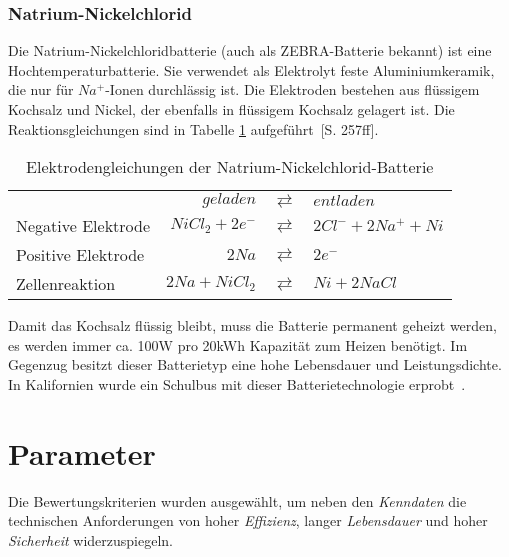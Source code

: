 \subsubsection{Natrium-Nickelchlorid}
Die Natrium-Nickelchloridbatterie (auch als ZEBRA-Batterie bekannt) ist eine Hochtemperaturbatterie. Sie verwendet als Elektrolyt feste Aluminiumkeramik, die nur für $Na^+$-Ionen durchlässig ist. Die Elektroden bestehen aus flüssigem Kochsalz und Nickel, der ebenfalls in flüssigem Kochsalz gelagert ist. Die Reaktionsgleichungen sind in Tabelle \ref{ZEBRA} aufgeführt~\cite{KiehneBattery}[S. 257ff].

\begin{table}\centering %
	\begin{tabularx}{\linewidth}{XrcX}
		\toprule
		&       $geladen$ & $\rightleftarrows$ & $entladen$           \\
		Negative Elektrode & $NiCl_2 + 2e^-$ & $\rightleftarrows$ & $2Cl^- + 2Na^+ + Ni$ \\
		Positive Elektrode &           $2Na$ & $\rightleftarrows$ & $2e^-$               \\ \midrule
		Zellenreaktion     &  $2Na + NiCl_2$ & $\rightleftarrows$ & $Ni + 2NaCl$ \\ \bottomrule
	\end{tabularx}
	\caption{Elektrodengleichungen der Natrium-Nickelchlorid-Batterie}
	\label{ZEBRA}
\end{table}

Damit das Kochsalz flüssig bleibt, muss die Batterie permanent geheizt werden, es werden immer ca. 100W pro 20kWh Kapazität zum Heizen benötigt. Im Gegenzug besitzt dieser Batterietyp eine hohe Lebensdauer und Leistungsdichte. In Kalifornien wurde ein Schulbus mit dieser Batterietechnologie erprobt~\cite{Electric-Transportation-Department:2004}.

\section{Parameter}
Die Bewertungskriterien wurden ausgewählt, um neben den \emph{Kenndaten} die technischen Anforderungen von hoher \emph{Effizienz}, langer \emph{Lebensdauer} und hoher \emph{Sicherheit} widerzuspiegeln. 

